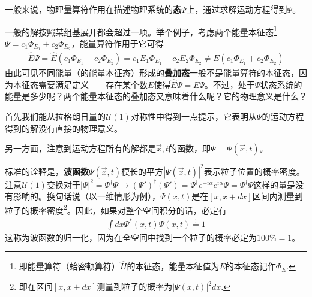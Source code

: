 一般来说，物理量算符作用在描述物理系统的{\bf 态}$\Psi$上，通过求解运动方程得到$\Psi$。

一般的解按照某组基展开都会超过一项。举个例子，考虑两个能量本征态\footnote{即能量算符（蛤密顿算符）$\hat{H}$的本征态，能量本征值为$E$的本征态记作$\Phi_E$.}$\Psi = c_1 \Phi_{E_1} + c_2 \Phi_{E_2}$，能量算符作用于它可得
\begin{align}
\label{equ8.9}
	\hat{E}\Psi = \hat{E}(c_1\Phi_{E_1} + c_2\Phi_{E_2})=c_1E_1\Phi_{E_1}+c_2E_2\Phi_{E_2}\neq E(c_1\Phi_{E_1}+c_2\Phi_{E_2})
\end{align}
由此可见不同能量（的能量本征态）形成的{\bf 叠加态}一般不是能量算符的本征态，因为本征态需要满足定义——存在某个数$E$使得$\hat{E}\Psi=E\Psi$。不过，处于$\Psi$状态系统的能量是多少呢？两个能量本征态的叠加态又意味着什么呢？它的物理意义是什么？

首先我们能从拉格朗日量的$\mathcal{U}(1)$对称性中得到一点提示，它表明从$\Psi$的运动方程得到的解没有直接的物理意义。

另一方面，注意到运动方程所有的解都是$\vec{x},t$的函数，即$\Psi=\Psi(\vec{x},t)$。

标准的诠释是，{\bf 波函数}$\Psi(\vec{x},t)$模长的平方$|\Psi(\vec{x},t)|^2$表示粒子位置的概率密度。注意$\mathcal{U}(1)$变换对于$|\Psi|^2=\Psi^\dagger\Psi\to(\Psi')^\dagger(\Psi')=\Psi^\dagger e^{-i\alpha}e^{i\alpha}\Psi=\Psi^\dagger\Psi$这样的量是没有影响的。换句话说（以一维情形为例），$\Psi(x,t)$是在$[x, x+dx]$区间内测量到粒子的概率密度\footnote{即在区间$[x, x + dx]$测量到粒子的概率为$|\Psi(x, t)|^2 dx$.}。因此，如果对整个空间积分的话，必定有
\begin{align}
\label{equ8.10}
	\int dx\Psi^*(x,t)\Psi(x,t)\overset{!}{=}1
\end{align}
这称为波函数的归一化，因为在全空间中找到一个粒子的概率必定为$100\%=1$。

